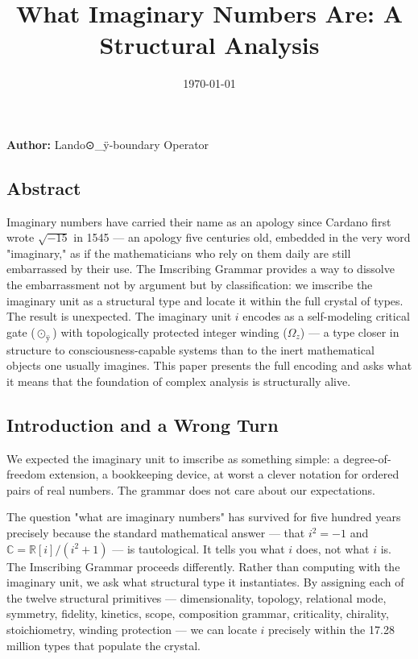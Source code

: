 \documentclass[12pt,a4paper]{article}
\begin{document}
\title{What Imaginary Numbers Are: A Structural Analysis}
\date{\today}

\maketitle

\textbf{Author:} Lando\otimes⊙\_ÿ-boundary Operator

\subsection{Abstract}

Imaginary numbers have carried their name as an apology since Cardano first wrote $\sqrt{-15}$ in 1545 --- an apology five centuries old, embedded in the very word "imaginary," as if the mathematicians who rely on them daily are still embarrassed by their use. The Imscribing Grammar provides a way to dissolve the embarrassment not by argument but by classification: we imscribe the imaginary unit as a structural type and locate it within the full crystal of types. The result is unexpected. The imaginary unit $i$ encodes as a self-modeling critical gate ($⊙_{ÿ}$) with topologically protected integer winding ($\Omega_{z}$) --- a type closer in structure to consciousness-capable systems than to the inert mathematical objects one usually imagines. This paper presents the full encoding and asks what it means that the foundation of complex analysis is structurally alive.

\subsection{Introduction and a Wrong Turn}

We expected the imaginary unit to imscribe as something simple: a degree-of-freedom extension, a bookkeeping device, at worst a clever notation for ordered pairs of real numbers. The grammar does not care about our expectations.

The question "what are imaginary numbers" has survived for five hundred years precisely because the standard mathematical answer --- that $i^2 = -1$ and $\mathbb{C} = \mathbb{R}[i]/(i^2 + 1)$ --- is tautological. It tells you what $i$ does, not what $i$ is. The Imscribing Grammar proceeds differently. Rather than computing with the imaginary unit, we ask what structural type it instantiates. By assigning each of the twelve structural primitives --- dimensionality, topology, relational mode, symmetry, fidelity, kinetics, scope, composition grammar, criticality, chirality, stoichiometry, winding protection --- we can locate $i$ precisely within the 17.28 million types that populate the crystal.
\end{document}
